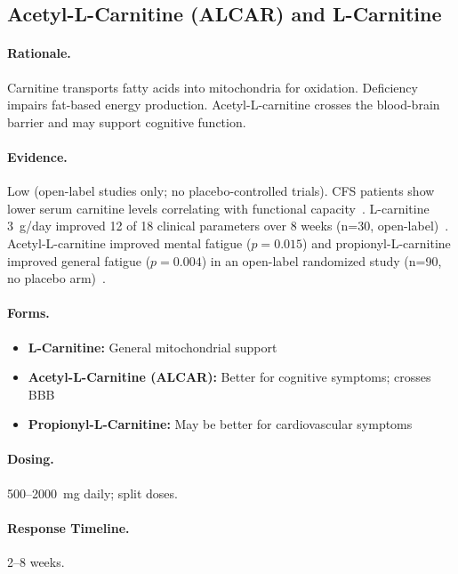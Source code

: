 \subsection{Acetyl-L-Carnitine (ALCAR) and L-Carnitine}

\paragraph{Rationale.} Carnitine transports fatty acids into mitochondria for oxidation. Deficiency impairs fat-based energy production. Acetyl-L-carnitine crosses the blood-brain barrier and may support cognitive function.

\paragraph{Evidence.} Low (open-label studies only; no placebo-controlled trials). CFS patients show lower serum carnitine levels correlating with functional capacity~\cite{Plioplys1995carnitine}. L-carnitine 3~g/day improved 12 of 18 clinical parameters over 8 weeks (n=30, open-label)~\cite{Plioplys1997carnitineTreatment}. Acetyl-L-carnitine improved mental fatigue ($p = 0.015$) and propionyl-L-carnitine improved general fatigue ($p = 0.004$) in an open-label randomized study (n=90, no placebo arm)~\cite{Vermeulen2004carnitine}.

\paragraph{Forms.}
\begin{itemize}
    \item \textbf{L-Carnitine:} General mitochondrial support
    \item \textbf{Acetyl-L-Carnitine (ALCAR):} Better for cognitive symptoms; crosses BBB
    \item \textbf{Propionyl-L-Carnitine:} May be better for cardiovascular symptoms
\end{itemize}

\paragraph{Dosing.} 500--2000~mg daily; split doses.

\paragraph{Response Timeline.} 2--8 weeks.

